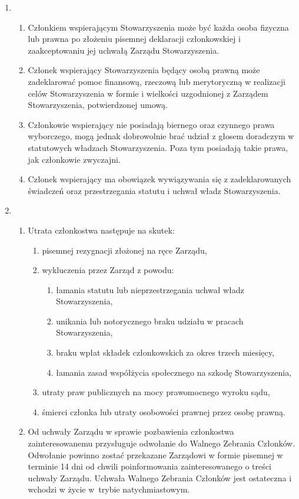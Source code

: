 \documentclass[chapterprefix,notitlepage]{article}
\begin{document}
\begin{enumerate}
	\item \begin{enumerate}
		\item Członkiem wspierającym Stowarzyszenia może być każda osoba fizyczna lub prawna po złożeniu pisemnej deklaracji członkowskiej i zaakceptowaniu jej uchwałą Zarządu Stowarzyszenia.
		\item Członek wspierający Stowarzyszenia będący osobą prawną może zadeklarować pomoc finansową, rzeczową lub merytoryczną w realizacji celów Stowarzyszenia w formie i wielkości uzgodnionej z Zarządem Stowarzyszenia, potwierdzonej umową.
		\item Członkowie wspierający nie posiadają biernego oraz czynnego prawa wyborczego, mogą jednak dobrowolnie brać udział z głosem doradczym w statutowych władzach Stowarzyszenia. Poza tym posiadają takie prawa, jak członkowie zwyczajni.
		\item Członek wspierający ma obowiązek wywiązywania się z zadeklarowanych świadczeń oraz przestrzegania statutu i uchwał władz Stowarzyszenia.
	\end{enumerate}
	
		\item \begin{enumerate}
			\item Utrata członkostwa następuje na skutek:
			\begin{enumerate}
				\item pisemnej rezygnacji złożonej na ręce Zarządu,
				\item wykluczenia przez Zarząd z powodu:
				\begin{enumerate}
					\item łamania statutu lub nieprzestrzegania uchwał władz Stowarzyszenia,
					\item unikania lub notorycznego braku udziału w pracach Stowarzyszenia,
					\item braku wpłat składek członkowskich za okres trzech miesięcy,
					\item łamania zasad współżycia społecznego na szkodę Stowarzyszenia,
				\end{enumerate}
				\item utraty praw publicznych na mocy prawomocnego wyroku sądu,
				\item śmierci członka lub utraty osobowości prawnej przez osobę prawną.
			\end{enumerate}
			\item Od uchwały Zarządu w sprawie pozbawienia członkostwa zainteresowanemu przysługuje odwołanie do Walnego Zebrania Członków. Odwołanie powinno zostać przekazane Zarządowi w formie pisemnej w terminie 14 dni od chwili poinformowania zainteresowanego o treści uchwały Zarządu. Uchwała Walnego Zebrania Członków jest ostateczna i wchodzi w życie w~trybie natychmiastowym.
		\end{enumerate}



\end{enumerate}
\end{document}
